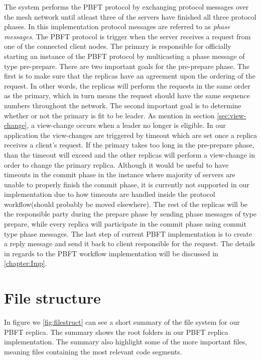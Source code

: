 The system performs the PBFT protocol by exchanging protocol messages over the mesh network until atleast three of the servers have finished all three protocol phases. In this implementation protocol messages are referred to as \emph{phase messages}. The PBFT protocol is trigger when the server receives a request from one of the connected client nodes. The primary is responsible for officially starting an instance of the PBFT protocol by multicasting a phase message of type pre-prepare. There are two important goals for the pre-prepare phase. The first is to make sure that the replicas have an agreement upon the ordering of the request. In other words, the replicas will perform the requests in the same order as the primary, which in turn means the request should have the same sequence numbers throughout the network. The second important goal is to determine whether or not the primary is fit to be leader. As mention in section \autoref{sec:view-change}, a view-change occurs when a leader no longer is eligible. In our application the view-changes are triggered by timeout which are set once a replica receives a client's request. If the primary takes too long in the pre-prepare phase, than the timeout will exceed and the other replicas will perform a view-change in order to change the primary replica. Although it would be useful to have timeouts in the commit phase in the instance where majority of servers are unable to properly finish the commit phase, it is currently not supported in our implementation due to how timeouts are handled inside the protocol workflow(should probably be moved elsewhere). The rest of the replicas will be the responsible party during the prepare phase by sending phase messages of type prepare, while every replica will participate in the commit phase using commit type phase messages. The last step of current PBFT implementation is to create a reply message and send it back to client responsible for the request. The details in regards to the PBFT workflow implementation will be discussed in \autoref{chapter:Imp}.

\section{File structure}
In figure we \autoref{fig:filestruct} can see a short summary of the file system for our PBFT replica. The summary shows the root folders in our PBFT replica implementation. The summary also highlight some of the more important files, meaning files containing the most relevant code segments. 

